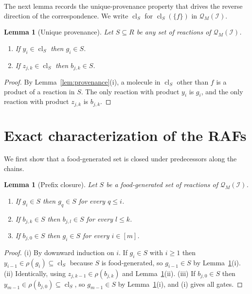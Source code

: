 \documentclass[11pt,a4paper]{article}
\theoremstyle{plain}
\newtheorem{lemma}[theorem]{Lemma}
\theoremstyle{definition}
\theoremstyle{remark}
\newcommand{\cl}{\operatorname{cl}}
\newcommand{\cQ}{\mathcal{Q}}
\newcommand{\cI}{\mathcal{I}}
\begin{document}
The next lemma records the unique-provenance property that drives the reverse direction of the correspondence. We write $\cl_S$ for $\cl_S(\{f\})$ in $\cQ_M(\cI)$.

\begin{lemma}[Unique provenance]\label{lem:origin}
Let $S\subseteq R$ be any set of reactions of $\cQ_M(\cI)$.
\begin{enumerate}[label=(\roman*)]
\item If $y_i\in\cl_S$ then $g_i\in S$.
\item If $z_{j,k}\in\cl_S$ then $b_{j,k}\in S$.
\end{enumerate}
\end{lemma}

\begin{proof}
By Lemma~\ref{lem:provenance}(i), a molecule in $\cl_S$ other than $f$ is a product of a reaction in $S$. The only reaction with product $y_i$ is $g_i$, and the only reaction with product $z_{j,k}$ is $b_{j,k}$.
\end{proof}

\section{Exact characterization of the RAFs}\label{sec:iff}

We first show that a food-generated set is closed under predecessors along the chains.

\begin{lemma}[Prefix closure]\label{lem:prefix}
Let $S$ be a food-generated set of reactions of $\cQ_M(\cI)$.
\begin{enumerate}[label=(\roman*)]
\item If $g_i\in S$ then $g_q\in S$ for every $q\le i$.
\item If $b_{j,k}\in S$ then $b_{j,l}\in S$ for every $l\le k$.
\item If $b_{j,0}\in S$ then $g_i\in S$ for every $i\in[m]$.
\end{enumerate}
\end{lemma}

\begin{proof}
(i) By downward induction on $i$. If $g_i\in S$ with $i\ge 1$ then $y_{i-1}\in\rho(g_i)\subseteq\cl_S$ because $S$ is food-generated, so $g_{i-1}\in S$ by Lemma~\ref{lem:origin}(i). (ii) Identically, using $z_{j,k-1}\in\rho(b_{j,k})$ and Lemma~\ref{lem:origin}(ii). (iii) If $b_{j,0}\in S$ then $y_{m-1}\in\rho(b_{j,0})\subseteq\cl_S$, so $g_{m-1}\in S$ by Lemma~\ref{lem:origin}(i), and (i) gives all gates.
\end{proof}
\end{document}

